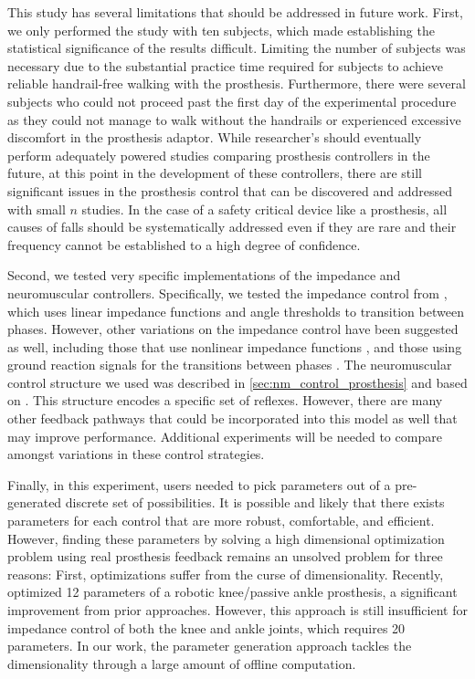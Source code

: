 This study has several limitations that should be addressed in future work.
First, we only performed the study with ten subjects, which made establishing
the statistical significance of the results difficult. Limiting the number of
subjects was necessary due to the substantial practice time required for
subjects to achieve reliable handrail-free walking with the prosthesis.
Furthermore, there were several  subjects who could not proceed
past the first day of the experimental procedure as they could not manage to
walk without the handrails or experienced excessive discomfort in the prosthesis
adaptor. While researcher's should eventually perform adequately powered studies
comparing prosthesis controllers in the future, at this point in the development
of these controllers, there are still significant issues in the prosthesis
control that can be discovered and addressed with small $n$ studies. In the case
of a safety critical device like a prosthesis, all causes of falls should be
systematically addressed even if they are rare and their frequency cannot be
established to a high degree of confidence.

Second, we tested very specific implementations of the impedance and
neuromuscular controllers. Specifically, we tested the impedance control from
\citet{lawson2014robotic}, which uses linear impedance functions and angle
thresholds to transition between phases. However, other variations on the
impedance control have been suggested as well, including those that use
nonlinear impedance functions \citep{sup2007design,shultz2016variable}, and
those using ground reaction signals for the transitions between phases
\citep{sup2009preliminary}. The neuromuscular control structure we used was
described in \cref{sec:nm_control_prosthesis} and based on
\citet{song2015neural}. This structure encodes a specific set of reflexes.
However, there are many other feedback pathways that could be incorporated into
this model as well that may improve performance. Additional experiments will be
needed to compare amongst variations in these control strategies.

Finally, in this experiment, users needed to pick parameters out of a
pre-generated discrete set of possibilities. It is possible and likely that there
exists parameters for each control that are more robust, comfortable, and
efficient. However, finding these parameters by solving a high dimensional
optimization problem using real prosthesis feedback remains an unsolved problem
for three reasons: First, optimizations suffer from the curse of dimensionality.
Recently, \citet{wen2019online} optimized 12 parameters of a robotic
knee/passive ankle prosthesis, a significant improvement from prior approaches.
However, this approach is still insufficient for impedance control of both the
knee and ankle joints, which requires 20 parameters. In our work, the parameter
generation approach tackles the dimensionality through a large amount of offline
computation.


